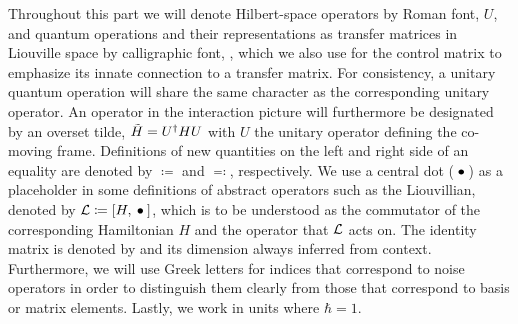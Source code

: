Throughout this part we will denote Hilbert-space operators by Roman font, \eg $U$, and quantum operations and their representations as transfer matrices in Liouville space by calligraphic font, \eg \liouvU, which we also use for the control matrix \ctrlmat to emphasize its innate connection to a transfer matrix.
For consistency, a unitary quantum operation will share the same character as the corresponding unitary operator.
An operator in the interaction picture will furthermore be designated by an overset tilde, \eg $\tilde{H} = U^\dagger H U$ with $U$ the unitary operator defining the co-moving frame.
Definitions of new quantities on the left and right side of an equality are denoted by $\coloneqq$ and $\eqqcolon$, respectively.
We use a central dot ($\:\bullet\:$) as a placeholder in some definitions of abstract operators such as the Liouvillian, denoted by $\mc{L}\coloneqq\comm{H}{\placeholder}$, which is to be understood as the commutator of the corresponding Hamiltonian $H$ and the operator that $\mathcal{L}$ acts on.
The identity matrix is denoted by \eye and its dimension always inferred from context.
Furthermore, we will use Greek letters for indices that correspond to noise operators in order to distinguish them clearly from those that correspond to basis or matrix elements.
Lastly, we work in units where $\hbar =  1$.
